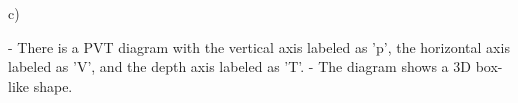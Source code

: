 c)

- There is a PVT diagram with the vertical axis labeled as 'p', the horizontal axis labeled as 'V', and the depth axis labeled as 'T'.
- The diagram shows a 3D box-like shape.
